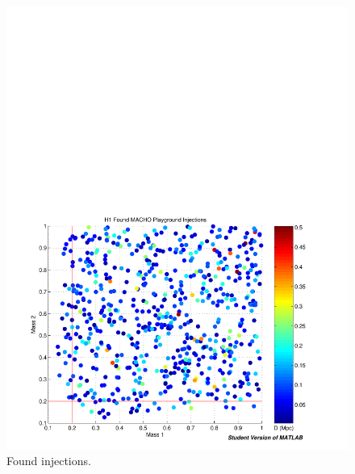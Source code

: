 \begin{figure}[p]
\begin{center}
\includegraphics[width=\textwidth]{analysis/figures/m1m2_found}
\end{center}
\caption{\label{f:m1m2_found}%
Found injections.
}
\end{figure}

